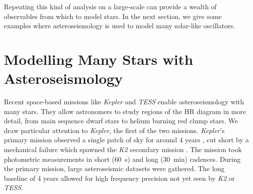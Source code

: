 

Repeating this kind of analysis on a large-scale can provide a wealth of observables from which to model stars. In the next section, we give some examples where asteroseismology is used to model many solar-like oscillators.

\section[Modelling Stars with Asteroseismology]{Modelling Many Stars with Asteroseismology}\label{sec:many-stars}

Recent space-based missions like \emph{Kepler} and \emph{TESS} enable asteroseismology with many stars. They allow astronomers to study regions of the HR diagram in more detail, from main sequence dwarf stars to helium burning red clump stars. We draw particular attention to \emph{Kepler}, the first of the two missions. \emph{Kepler}'s primary mission observed a single patch of sky for around 4 years \citep{Borucki.Koch.ea2010}, cut short by a mechanical failure which spawned the \emph{K2} secondary mission \citep{Howell.Sobeck.ea2014}. The mission took photometric measurements in short (\SI{60}{\second}) and long (\SI{30}{\minute}) cadences. During the primary mission, large asteroseismic datasets were gathered. The long baseline of 4 years allowed for high frequency precision not yet seen by \emph{K2} or \emph{TESS}.


